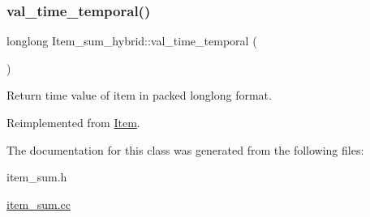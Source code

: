 \subsubsection{\texorpdfstring{val\+\_\+time\+\_\+temporal()}{val\_time\_temporal()}}
{\footnotesize\ttfamily longlong Item\+\_\+sum\+\_\+hybrid\+::val\+\_\+time\+\_\+temporal (\begin{DoxyParamCaption}{ }\end{DoxyParamCaption})\hspace{0.3cm}{\ttfamily [virtual]}}

Return time value of item in packed longlong format. 

Reimplemented from \mbox{\hyperlink{classItem_a69ef60a3917a1bb4832498a695754c58}{Item}}.



The documentation for this class was generated from the following files\+:\begin{DoxyCompactItemize}
\item 
item\+\_\+sum.\+h\item 
\mbox{\hyperlink{item__sum_8cc}{item\+\_\+sum.\+cc}}\end{DoxyCompactItemize}
